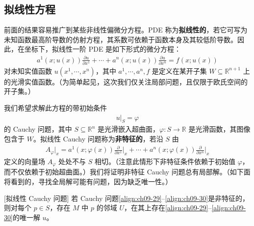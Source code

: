 \documentclass[../../main.tex]{subfiles}
\begin{document}
\subsection*{拟线性方程}

前面的结果容易推广到某些非线性偏微分方程。PDE 称为\textbf{拟线性的}，若它可写为未知函数最高阶导数的仿射方程，其系数可依赖于函数本身及其较低阶导数。因此，在坐标下，拟线性一阶 PDE 是如下形式的微分方程：
\begin{align}
a^1(x;u(x))\frac{\partial u}{\partial x^1}+\cdots+a^n(x;u(x))\frac{\partial u}{\partial x^n}=f(x;u(x)) \label{align:ch09-29}
\end{align}
对未知实值函数 $u(x^1,\cdots ,x^n)$，其中 $a^1,\cdots ,a^n,f$ 是定义在某开子集 $W\subseteq\mathbb{R}^{n+1}$ 上的光滑实值函数。（为简单起见，这次我们仅关注局部问题，且仅限于欧氏空间的开子集。）

我们希望求解此方程的带初始条件
\begin{align}
u|_S=\varphi \label{align:ch09-30}
\end{align}
的 Cauchy 问题，其中 $S\subseteq\mathbb{R}^n$ 是光滑嵌入超曲面，$\varphi\colon S\to\mathbb{R}$ 是光滑函数，其图像包含于 $W$。拟线性 Cauchy 问题称为\textbf{非特征的}，若沿 $S$ 由
\begin{align}
A_\varphi\bigg|_x=a^1(x;\varphi(x))\frac{\partial}{\partial x^1}\bigg|_x+\cdots+a^n(x;\varphi(x))\frac{\partial}{\partial x^n}\bigg|_x \label{align:ch09-31}
\end{align}
定义的向量场 $A_\varphi$ 处处不与 $S$ 相切。（注意此情形下非特征条件依赖于初始值 $\varphi$，而不仅依赖于初始超曲面。）我们将证明非特征 Cauchy 问题总有局部解。（如下面将看到的，寻找全局解可能有问题，因为缺乏唯一性。）

\begin{theorem}\label{theorem:ch09-53}[拟线性 Cauchy 问题]
若 Cauchy 问题\eqref{align:ch09-29}--\eqref{align:ch09-30}是非特征的，则对每个 $p\in S$，存在 $M$ 中 $p$ 的邻域 $U$，在其上存在\eqref{align:ch09-29}--\eqref{align:ch09-30}的唯一解 $u$。
\end{theorem}
\end{document}
